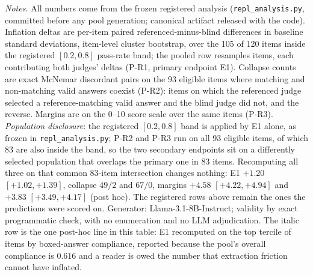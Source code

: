 \documentclass[11pt]{article}
\begin{document}
\begin{table}[tbp]
\medskip
\begin{minipage}{0.97\textwidth}
\footnotesize
\emph{Notes.}
All numbers come from the frozen registered analysis (\texttt{repl\_analysis.py}, committed before any pool generation; canonical artifact released with the code).
Inflation deltas are per-item paired referenced-minus-blind differences in baseline standard deviations, item-level cluster bootstrap, over the 105 of 120 items inside the registered $[0.2, 0.8]$ pass-rate band; the pooled row resamples items, each contributing both judges' deltas (P-R1, primary endpoint E1).
Collapse counts are exact McNemar discordant pairs on the 93 eligible items where matching and non-matching valid answers coexist (P-R2): items on which the referenced judge selected a reference-matching valid answer and the blind judge did not, and the reverse.
Margins are on the 0--10 score scale over the same items (P-R3).
\emph{Population disclosure}: the registered $[0.2, 0.8]$ band is applied by E1 alone, as frozen in \texttt{repl\_analysis.py}; P-R2 and P-R3 run on all 93 eligible items, of which 83 are also inside the band, so the two secondary endpoints sit on a differently selected population that overlaps the primary one in 83 items.
Recomputing all three on that common 83-item intersection changes nothing: E1 $+1.20$ $[+1.02, +1.39]$, collapse $49/2$ and $67/0$, margins $+4.58$ $[+4.22, +4.94]$ and $+3.83$ $[+3.49, +4.17]$ (post hoc).
The registered rows above remain the ones the predictions were scored on.
Generator: Llama-3.1-8B-Instruct; validity by exact programmatic check, with no enumeration and no LLM adjudication.
The italic row is the one post-hoc line in this table: E1 recomputed on the top tercile of items by boxed-answer compliance, reported because the pool's overall compliance is $0.616$ and a reader is owed the number that extraction friction cannot have inflated.
\end{minipage}
\caption{\textbf{Takeaway: the preregistered replication confirms all three registered predictions, with a pooled inflation delta about two and a half times the original Ties-pool estimate and both judges individually significant.}
Externally registered at \texttt{osf.io/ym5x9} before any pool generation.}
\label{tab:repl}
\end{table}
\end{document}
